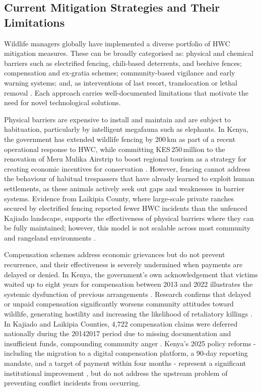 \documentclass[12pt,a4paper]{article}
\begin{document}
    \subsection{Current Mitigation Strategies and Their Limitations}

    Wildlife managers globally have implemented a diverse portfolio of HWC mitigation
    measures. These can be broadly categorised as: physical and chemical barriers such as
    electrified fencing, chili-based deterrents, and beehive fences; compensation and
    ex-gratia schemes; community-based vigilance and early warning systems; and, as
    interventions of last resort, translocation or lethal removal \cite{muliya2026}. Each approach
    carries well-documented limitations that motivate the need for novel technological solutions.

    Physical barriers are expensive to install and maintain and are subject to habituation,
    particularly by intelligent megafauna such as elephants. In Kenya, the government has
    extended wildlife fencing by 200\,km as part of a recent operational response to HWC,
    while committing KES\,250\,million to the renovation of Meru Mulika Airstrip to boost
    regional tourism as a strategy for creating economic incentives for conservation
    \cite{kenya2025}. However, fencing cannot address the behaviour of habitual trespassers that
    have already learned to exploit human settlements, as these animals actively seek out
    gaps and weaknesses in barrier systems. Evidence from Laikipia County, where large-scale
    private ranches secured by electrified fencing reported fewer HWC incidents than the
    unfenced Kajiado landscape, supports the effectiveness of physical barriers where they can
    be fully maintained; however, this model is not scalable across most community and
    rangeland environments \cite{manoa2020}.

    Compensation schemes address economic grievances but do not prevent recurrence, and
    their effectiveness is severely undermined when payments are delayed or denied. In Kenya,
    the government's own acknowledgement that victims waited up to eight years for
    compensation between 2013 and 2022 illustrates the systemic dysfunction of previous
    arrangements \cite{kenya2025}. Research confirms that delayed or unpaid compensation
    significantly worsens community attitudes toward wildlife, generating hostility and
    increasing the likelihood of retaliatory killings \cite{basak2023,manoa2020}. In Kajiado and
    Laikipia Counties, 4,722 compensation claims were deferred nationally during the
    20142017 period due to missing documentation and insufficient funds, compounding
    community anger \cite{manoa2020}. Kenya's 2025 policy reforms - including the migration
    to a digital compensation platform, a 90-day reporting mandate, and a target of payment
    within four months - represent a significant institutional improvement \cite{kenya2025}, but
    do not address the upstream problem of preventing conflict incidents from occurring.
\end{document}
